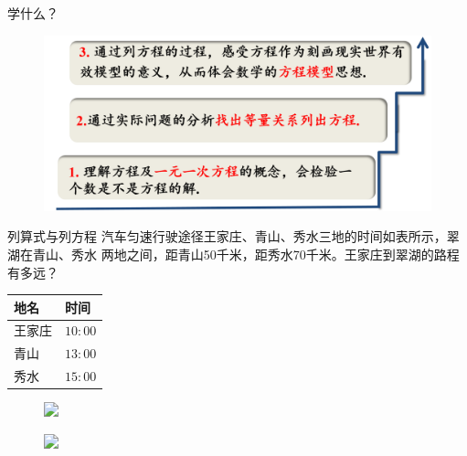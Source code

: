 \begin{frame}{学什么？}
    \begin{figure}
        \includegraphics[width=.9\textwidth]{assets/equation teaching.png}
    \end{figure}
\end{frame}

\begin{frame}{列算式与列方程}
    汽车匀速行驶途径王家庄、青山、秀水三地的时间如表所示，翠湖在青山、秀水
    两地之间，距青山50千米，距秀水70千米。王家庄到翠湖的路程有多远？
    \begin{table}
        \setlength{\extrarowheight}{1.5pt}
        \begin{tabular}{ll}
            地名 & 时间 \\
            \hline
            王家庄 & $10:00$ \\
            \hline
            青山 & $13:00$ \\
            \hline
            秀水 & $15:00$ \\
            \hline
        \end{tabular}
    \end{table}

    \begin{figure}
        \includegraphics<2>[width=.9\textwidth]{assets/equation examp2.png}
    \end{figure}

    \begin{figure}
        \includegraphics<3>[width=.7\textwidth]{assets/equation examp3.png}
    \end{figure}
\end{frame}

